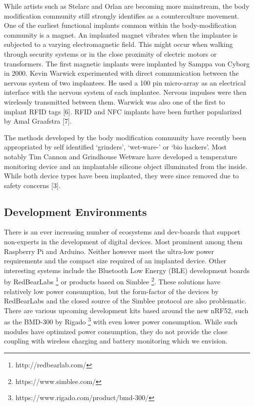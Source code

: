 \documentclass[runningheads,a4paper]{llncs}
\begin{document}
While artists such as Stelarc and Orlan are becoming more mainstream, the body modification community still strongly identifies as a counterculture movement. One of the earliest functional implants common within the body-modification community is a magnet. An implanted magnet vibrates when the implantee is subjected to a varying electromagnetic field. This might occur when walking through security systems or in the close proximity of electric motors or transformers. The first magnetic implants were implanted by Samppa von Cyborg in 2000. 
Kevin Warwick experimented with direct communication between the nervous system of two implantees. He used a 100 pin micro-array as an electrical interface with the nervous system of each implantee. Nervous impulses were then wirelessly transmitted between them. Warwick was also one of the first to implant RFID tags [6]. RFID and NFC implants have been further popularized by Amal Graafstra [7].

The methods developed by the body modification community have recently been appropriated by self identified ‘grinders’, ‘wet-ware-’ or ‘bio hackers’. Most notably Tim Cannon and Grindhouse Wetware have developed a temperature monitoring device and an implantable silicone object illuminated from the inside. While both device types have been implanted, they were since removed due to safety concerns [3].

\subsection{Development Environments}
There is an ever increasing number of ecosystems and dev-boards that support non-experts in the development of digital devices. Most prominent among them Raspberry Pi and Arduino. Neither however meet the ultra-low power requirements and the compact size required of an implanted device. Other interesting systems include the Bluetooth Low Energy (BLE) development boards by RedBearLabs \footnote{http://redbearlab.com/}  or products based on Simblee \footnote{https://www.simblee.com/}. These solutions have relatively low power consumption, but the form-factor of the devices by RedBearLabs and the closed source of the Simblee protocol are also problematic. There are various upcoming development kits based around the new nRF52, such as the BMD-300  by Rigado \footnote{https://www.rigado.com/product/bmd-300/} with even lower power consumption. While such modules have optimized power consumption, they do not provide the close coupling with wireless charging and battery monitoring which we envision.
\end{document}
